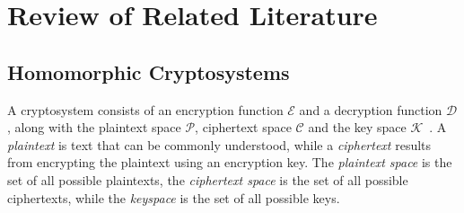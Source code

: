 \section{Review of Related Literature}
\subsection{Homomorphic Cryptosystems}
A cryptosystem consists of an encryption function $\mathcal{E}$ and a decryption function $\mathcal{D}$, along with the plaintext space $\mathcal{P}$, ciphertext space $\mathcal{C}$ and the key space $\mathcal{K}$~\cite{bauer_cryptosystem_2005}. A \textit{plaintext} is text that can be commonly understood, while a \textit{ciphertext} results from encrypting the plaintext using an encryption key. The \textit{plaintext space} is the set of all possible plaintexts, the \textit{ciphertext space} is the set of all possible ciphertexts, while the \textit{keyspace} is the set of all possible keys.



